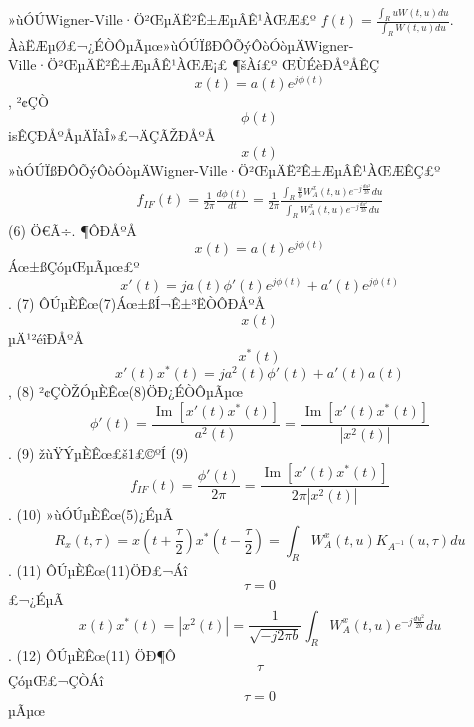 \documentclass[12pt,openany,CJK,oneside]{cctbook}
\begin{document}
»ùÓÚWigner-Ville·Ö²ŒµÄË²Ê±ÆµÂÊ¹ÀŒÆ£º
$f\left( t \right)=\frac{\int_{R}{uW\left( t,u \right)du}}{\int_{R}{W\left( t,u \right)du}}$.
ÀàËÆµØ£¬¿ÉÒÔµÃµœ»ùÓÚÏßÐÔÕýÔòÓòµÄWigner-Ville·Ö²ŒµÄË²Ê±ÆµÂÊ¹ÀŒÆ¡£
¶šÀí£º ŒÙÉèÐÅºÅÊÇ\[x\left( t \right)=a\left( t \right){{e}^{j\phi \left( t \right)}}\], ²¢ÇÒ\[\phi \left( t \right)\]isÊÇÐÅºÅµÄÏàÎ»£¬ÄÇÃŽÐÅºÅ\[x\left( t \right)\]»ùÓÚÏßÐÔÕýÔòÓòµÄWigner-Ville·Ö²ŒµÄË²Ê±ÆµÂÊ¹ÀŒÆÊÇ£º
\begin{align}{{f}_{IF}}\left( t \right)=\frac{1}{2\pi }\frac{d\phi \left( t \right)}{dt}=\frac{1}{2\pi }\frac{\int_{R}{\frac{u}{b}W_{A}^{x}\left( t,u \right){{e}^{-j\frac{d{{u}^{2}}}{2b}}}du}}{\int_{R}{W_{A}^{x}\left( t,u \right){{e}^{-j\frac{d{{u}^{2}}}{2b}}}du}}
\end{align}            (6)
Ö€Ã÷.
¶ÔÐÅºÅ\[x\left( t \right)=a\left( t \right){{e}^{j\phi \left( t \right)}}\]Áœ±ßÇóµŒµÃµœ£º
\[{x}'\left( t \right)=ja\left( t \right){\phi }'\left( t \right){{e}^{j\phi \left( t \right)}}+{a}'\left( t \right){{e}^{j\phi \left( t \right)}}\].               (7)
ÔÚµÈÊœ(7)Áœ±ßÍ¬Ê±³ËÒÔÐÅºÅ\[x\left( t \right)\]µÄ¹²éîÐÅºÅ\[{{x}^{*}}\left( t \right)\]
\[{x}'\left( t \right){{x}^{*}}\left( t \right)=j{{a}^{2}}\left( t \right){\phi }'\left( t \right)+{a}'\left( t \right)a\left( t \right)\],               (8)
²¢ÇÒŽÓµÈÊœ(8)ÖÐ¿ÉÒÔµÃµœ
\[{\phi }'\left( t \right)=\frac{\operatorname{Im}\left[ {x}'\left( t \right){{x}^{*}}\left( t \right) \right]}{{{a}^{2}}\left( t \right)}=\frac{\operatorname{Im}\left[ {x}'\left( t \right){{x}^{*}}\left( t \right) \right]}{\left| {{x}^{2}}\left( t \right) \right|}\].             (9)
    žùŸÝµÈÊœ£š1£©ºÍ (9)
\[{{f}_{IF}}\left( t \right)=\frac{{\phi }'\left( t \right)}{2\pi }=\frac{\operatorname{Im}\left[ {x}'\left( t \right){{x}^{*}}\left( t \right) \right]}{2\pi \left| {{x}^{2}}\left( t \right) \right|}\].              (10)
»ùÓÚµÈÊœ(5)¿ÉµÃ
\[{{R}_{x}}\left( t,\tau  \right)=x\left( t+\frac{\tau }{2} \right){{x}^{*}}\left( t-\frac{\tau }{2} \right)=\int_{R}{W_{A}^{x}\left( t,u \right){{K}_{{{A}^{-1}}}}\left( u,\tau  \right)du}\].    (11)
    ÔÚµÈÊœ(11)ÖÐ£¬Áî\[\tau =\text{0}\]£¬¿ÉµÃ
\[x\left( t \right){{x}^{*}}\left( t \right)=\left| {{x}^{2}}\left( t \right) \right|=\frac{1}{\sqrt{-j2\pi b}}\int_{R}{W_{A}^{x}\left( t,u \right){{e}^{-j\frac{d{{u}^{2}}}{2b}}}du}\].       (12)
    ÔÚµÈÊœ(11) ÖÐ¶Ô\[\tau \]ÇóµŒ£¬ÇÒÁî\[\tau =\text{0}\]µÃµœ
\end{document}
